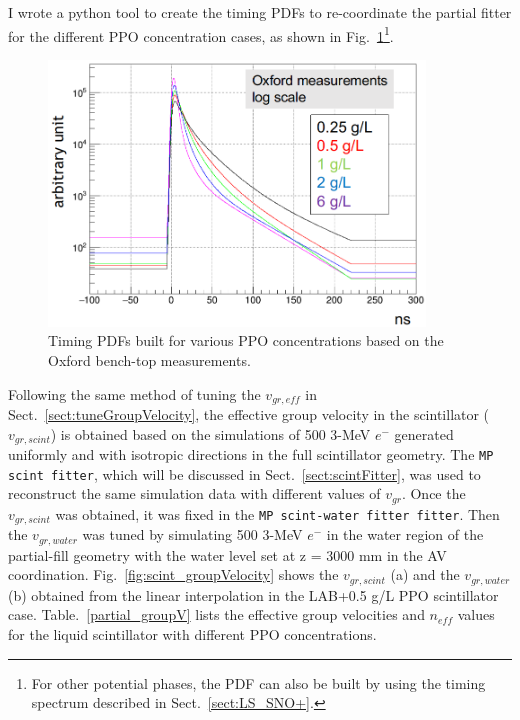 I wrote a python tool to create the timing PDFs to re-coordinate the partial fitter for the different PPO concentration cases\cite{partialFitterPDF}, as shown in Fig.~\ref{fig:oxfordPdf}\footnote{For other potential phases, the PDF can also be built by using the timing spectrum described in Sect.~\ref{sect:LS_SNO+}.}.
\begin{figure}[!htb]
	\centering
	\includegraphics[width=10cm]{oxfordPdf_log.png}
	\caption{Timing PDFs built for various PPO concentrations based on the Oxford bench-top measurements.}
	\label{fig:oxfordPdf}
\end{figure}

Following the same method of tuning the $v_{gr,eff}$ in Sect.~\ref{sect:tuneGroupVelocity}, the effective group velocity in the scintillator ($v_{gr,scint}$) is obtained based on the simulations of 500 3-MeV $e^-$ generated uniformly and with isotropic directions in the full scintillator geometry. The \texttt{MP scint fitter}, which will be discussed in Sect.~\ref{sect:scintFitter}, was used to reconstruct the same simulation data with different values of $v_{gr}$. Once the $v_{gr,scint}$ was obtained, it was fixed in the \texttt{MP scint-water fitter fitter}. Then the $v_{gr,water}$ was tuned by simulating 500 3-MeV $e^-$ in the water region of the partial-fill geometry with the water level set at z = 3000 mm in the AV coordination. Fig.~\ref{fig:scint_groupVelocity} shows the $v_{gr,scint}$ (a) and the $v_{gr,water}$ (b) obtained from the linear interpolation in the LAB+0.5 g/L PPO scintillator case. Table.~\ref{partial_groupV} lists the effective group velocities and $n_{eff}$ values for the liquid scintillator with different PPO concentrations. 
		
